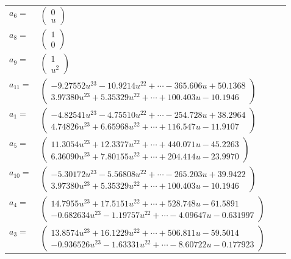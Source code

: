 \documentclass[1p]{elsarticle_modified}
\theoremstyle{definition}
\begin{document}
\begin{tabular}{m{7pt} m{180pt} m{7pt} m{180pt} }
\flushright $a_{6}=$&$\begin{pmatrix}0\\u\end{pmatrix}$ \\
\flushright $a_{8}=$&$\begin{pmatrix}1\\0\end{pmatrix}$ \\
\flushright $a_{9}=$&$\begin{pmatrix}1\\u^2\end{pmatrix}$ \\
\flushright $a_{11}=$&$\begin{pmatrix}-9.27552 u^{23}-10.9214 u^{22}+\cdots-365.606 u+50.1368\\3.97380 u^{23}+5.35329 u^{22}+\cdots+100.403 u-10.1946\end{pmatrix}$ \\
\flushright $a_{1}=$&$\begin{pmatrix}-4.82541 u^{23}-4.75510 u^{22}+\cdots-254.728 u+38.2964\\4.74826 u^{23}+6.65968 u^{22}+\cdots+116.547 u-11.9107\end{pmatrix}$ \\
\flushright $a_{5}=$&$\begin{pmatrix}11.3054 u^{23}+12.3377 u^{22}+\cdots+440.071 u-45.2263\\6.36090 u^{23}+7.80155 u^{22}+\cdots+204.414 u-23.9970\end{pmatrix}$ \\
\flushright $a_{10}=$&$\begin{pmatrix}-5.30172 u^{23}-5.56808 u^{22}+\cdots-265.203 u+39.9422\\3.97380 u^{23}+5.35329 u^{22}+\cdots+100.403 u-10.1946\end{pmatrix}$ \\
\flushright $a_{4}=$&$\begin{pmatrix}14.7955 u^{23}+17.5151 u^{22}+\cdots+528.748 u-61.5891\\-0.682634 u^{23}-1.19757 u^{22}+\cdots-4.09647 u-0.631997\end{pmatrix}$ \\
\flushright $a_{3}=$&$\begin{pmatrix}13.8574 u^{23}+16.1229 u^{22}+\cdots+506.811 u-59.5014\\-0.936526 u^{23}-1.63331 u^{22}+\cdots-8.60722 u-0.177923\end{pmatrix}$ \\

\end{tabular}
\end{document}
